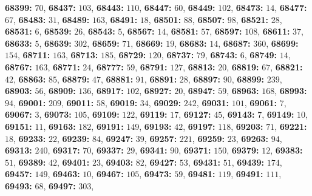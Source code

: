 \textsf{\bfseries 68399:} $70$, \textsf{\bfseries 68437:} $103$, \textsf{\bfseries 68443:} $110$, \textsf{\bfseries 68447:} $60$, \textsf{\bfseries 68449:} $102$, \textsf{\bfseries 68473:} $14$, \textsf{\bfseries 68477:} $67$, \textsf{\bfseries 68483:} $31$, \textsf{\bfseries 68489:} $163$, \textsf{\bfseries 68491:} $18$, \textsf{\bfseries 68501:} $88$, \textsf{\bfseries 68507:} $98$, \textsf{\bfseries 68521:} $28$, \textsf{\bfseries 68531:} $6$, \textsf{\bfseries 68539:} $26$, \textsf{\bfseries 68543:} $5$, \textsf{\bfseries 68567:} $14$, \textsf{\bfseries 68581:} $57$, \textsf{\bfseries 68597:} $108$, \textsf{\bfseries 68611:} $37$, \textsf{\bfseries 68633:} $5$, \textsf{\bfseries 68639:} $302$, \textsf{\bfseries 68659:} $71$, \textsf{\bfseries 68669:} $19$, \textsf{\bfseries 68683:} $14$, \textsf{\bfseries 68687:} $360$, \textsf{\bfseries 68699:} $154$, \textsf{\bfseries 68711:} $163$, \textsf{\bfseries 68713:} $185$, \textsf{\bfseries 68729:} $120$, \textsf{\bfseries 68737:} $79$, \textsf{\bfseries 68743:} $6$, \textsf{\bfseries 68749:} $14$, \textsf{\bfseries 68767:} $163$, \textsf{\bfseries 68771:} $24$, \textsf{\bfseries 68777:} $59$, \textsf{\bfseries 68791:} $127$, \textsf{\bfseries 68813:} $20$, \textsf{\bfseries 68819:} $67$, \textsf{\bfseries 68821:} $42$, \textsf{\bfseries 68863:} $85$, \textsf{\bfseries 68879:} $47$, \textsf{\bfseries 68881:} $91$, \textsf{\bfseries 68891:} $28$, \textsf{\bfseries 68897:} $90$, \textsf{\bfseries 68899:} $239$, \textsf{\bfseries 68903:} $56$, \textsf{\bfseries 68909:} $136$, \textsf{\bfseries 68917:} $102$, \textsf{\bfseries 68927:} $20$, \textsf{\bfseries 68947:} $59$, \textsf{\bfseries 68963:} $168$, \textsf{\bfseries 68993:} $94$, \textsf{\bfseries 69001:} $209$, \textsf{\bfseries 69011:} $58$, \textsf{\bfseries 69019:} $34$, \textsf{\bfseries 69029:} $242$, \textsf{\bfseries 69031:} $101$, \textsf{\bfseries 69061:} $7$, \textsf{\bfseries 69067:} $3$, \textsf{\bfseries 69073:} $105$, \textsf{\bfseries 69109:} $122$, \textsf{\bfseries 69119:} $17$, \textsf{\bfseries 69127:} $45$, \textsf{\bfseries 69143:} $7$, \textsf{\bfseries 69149:} $10$, \textsf{\bfseries 69151:} $11$, \textsf{\bfseries 69163:} $182$, \textsf{\bfseries 69191:} $149$, \textsf{\bfseries 69193:} $42$, \textsf{\bfseries 69197:} $118$, \textsf{\bfseries 69203:} $71$, \textsf{\bfseries 69221:} $18$, \textsf{\bfseries 69233:} $22$, \textsf{\bfseries 69239:} $84$, \textsf{\bfseries 69247:} $39$, \textsf{\bfseries 69257:} $221$, \textsf{\bfseries 69259:} $23$, \textsf{\bfseries 69263:} $94$, \textsf{\bfseries 69313:} $240$, \textsf{\bfseries 69317:} $70$, \textsf{\bfseries 69337:} $29$, \textsf{\bfseries 69341:} $90$, \textsf{\bfseries 69371:} $150$, \textsf{\bfseries 69379:} $12$, \textsf{\bfseries 69383:} $51$, \textsf{\bfseries 69389:} $42$, \textsf{\bfseries 69401:} $23$, \textsf{\bfseries 69403:} $82$, \textsf{\bfseries 69427:} $53$, \textsf{\bfseries 69431:} $51$, \textsf{\bfseries 69439:} $174$, \textsf{\bfseries 69457:} $149$, \textsf{\bfseries 69463:} $10$, \textsf{\bfseries 69467:} $105$, \textsf{\bfseries 69473:} $59$, \textsf{\bfseries 69481:} $119$, \textsf{\bfseries 69491:} $111$, \textsf{\bfseries 69493:} $68$, \textsf{\bfseries 69497:} $303$, 
